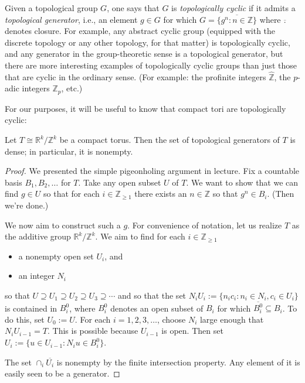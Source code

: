 \documentclass[reqno]{amsart} 
\begin{document}
Given a topological group $G$, one says that $G$ is \emph{topologically cyclic} if it admits a \emph{topological generator}, i.e., an element $g \in G$ for which $G = \overline{\{g^n : n \in \mathbb{Z} \}}$ where $\overline{.}$ denotes closure.  For example, any abstract cyclic group (equipped with the discrete topology or any other topology, for that matter) is topologically cyclic, and any generator in the group-theoretic sense is a topological generator, but there are more interesting examples of topologically cyclic groups than just those that are cyclic in the ordinary sense.  (For example: the profinite integers $\hat{\mathbb{Z} }$, the $p$-adic integers $\mathbb{Z}_p$, etc.)

For our purposes, it will be useful to know that compact tori are topologically cyclic:
\begin{lemma}
  Let $T \cong \mathbb{R}^k/\mathbb{Z}^k$ be a compact torus.  Then the set of topological generators of $T$ is dense; in particular, it is nonempty.
\end{lemma}
\begin{proof}
  We presented the simple pigeonholing argument in lecture.  Fix a countable basis $B_1,B_2,\dotsc$ for $T$.  Take any open subset $U$ of $T$.  We want to show that we can find $g \in U$ so that for each $i \in \mathbb{Z}_{\geq 1}$ there exists an $n \in \mathbb{Z}$ so that $g^n \in B_i$.  (Then we're done.)

  We now aim to construct such a $g$.  For convenience of notation, let us realize $T$ as the additive group $\mathbb{R}^k/\mathbb{Z}^k$.  We aim to find for each $i \in \mathbb{Z}_{\geq 1}$
  \begin{itemize}
  \item a nonempty open set $U_i$, and
  \item an integer $N_i$
  \end{itemize}
  so that $U \supseteq U_1 \supseteq U_2 \supseteq U_3 \supseteq \dotsb$ and so that the set $N_i U_i := \{n_i c_i : n_i \in N_i, c_i \in U_i\}$ is contained in $B_i^0$, where $B_i^0$ denotes an open subset of $B_i$ for which $\overline{B_i^0} \subseteq B_i$.  To do this, set $U_0 := U$.  For each $i=1,2,3, \dotsc$, choose $N_i$ large enough that $N_i U_{i-1} = T$.  This is possible because $U_{i-1}$ is open.  Then set $U_i := \{u \in U_{i-1} : N_i u \in B_i^0\}$.

  The set $\cap_i \overline{U_i}$ is nonempty by the finite intersection property.  Any element of it is easily seen to be a generator.
\end{proof}
\end{document}
